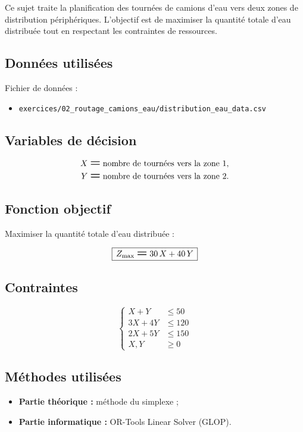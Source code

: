 \documentclass[12pt,a4paper]{article}
\newcommand{\Eq}{\mathrel{\text{\Large\bfseries =}}}
\newcommand{\Leq}{\leqslant}
\newcommand{\Geq}{\geqslant}
\newcommand{\BoxedEq}[1]{%
  \begin{equation*}
    \boxed{\,\displaystyle #1\,}
  \end{equation*}%
}
\begin{document}
Ce sujet traite la planification des tournées de camions d'eau vers deux zones de distribution périphériques. L'objectif est de maximiser la quantité totale d'eau distribuée tout en respectant les contraintes de ressources.

\subsection{Données utilisées}
Fichier de données :
\begin{itemize}
    \item \texttt{exercices/02\_routage\_camions\_eau/distribution\_eau\_data.csv}
\end{itemize}

\subsection{Variables de décision}

\[
\begin{aligned}
X &\Eq \text{nombre de tournées vers la zone 1}, \\
Y &\Eq \text{nombre de tournées vers la zone 2}.
\end{aligned}
\]

\subsection{Fonction objectif}

Maximiser la quantité totale d'eau distribuée :

\BoxedEq{Z_{\mathrm{max}} \Eq 30\,X + 40\,Y}

\subsection{Contraintes}

\[
\left\{
\begin{aligned}
X + Y     &\Leq 50  \\
3X + 4Y   &\Leq 120 \\
2X + 5Y   &\Leq 150 \\
X, Y      &\Geq 0
\end{aligned}
\right.
\]

\subsection{Méthodes utilisées}
\begin{itemize}
    \item \textbf{Partie théorique :} méthode du simplexe ;
    \item \textbf{Partie informatique :} OR-Tools Linear Solver (GLOP).
\end{itemize}
\end{document}
